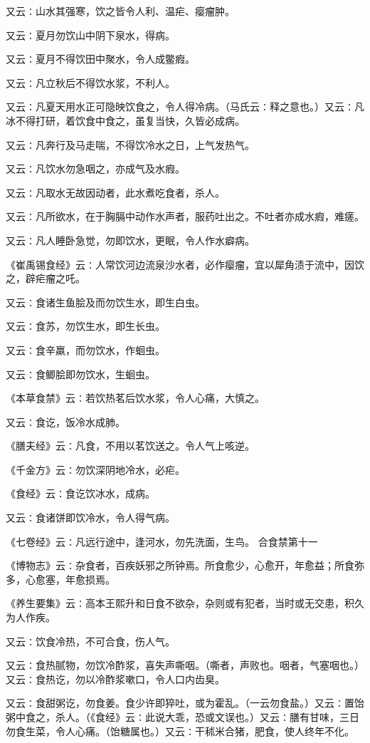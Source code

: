 \documentclass[a4paper,12pt,UTF8,twoside]{ctexbook}
\begin{document}
又云∶山水其强寒，饮之皆令人利、温疟、瘿瘤肿。

又云∶夏月勿饮山中阴下泉水，得病。

又云∶夏月不得饮田中聚水，令人成鳖瘕。

又云∶凡立秋后不得饮水浆，不利人。

又云∶凡夏天用水正可隐映饮食之，令人得冷病。（马氏云∶释之意也。）又云∶凡冰不得打研，着饮食中食之，虽复当快，久皆必成病。

又云∶凡奔行及马走喘，不得饮冷水之日，上气发热气。

又云∶凡饮水勿急咽之，亦成气及水瘕。

又云∶凡取水无故因动者，此水煮吃食者，杀人。

又云∶凡所欲水，在于胸膈中动作水声者，服药吐出之。不吐者亦成水瘕，难瘥。

又云∶凡人睡卧急觉，勿即饮水，更眠，令人作水癖病。

《崔禹锡食经》云∶人常饮河边流泉沙水者，必作瘿瘤，宜以犀角渍于流中，因饮之，辟疟瘤之吒。

又云∶食诸生鱼脍及而勿饮生水，即生白虫。

又云∶食苏，勿饮生水，即生长虫。

又云∶食辛羸，而勿饮水，作蛔虫。

又云∶食鲫脍即勿饮水，生蛔虫。

《本草食禁》云∶若饮热茗后饮水浆，令人心痛，大慎之。

又云∶食讫，饭冷水成肺。

《膳夫经》云∶凡食，不用以茗饮送之。令人气上咳逆。

《千金方》云∶勿饮深阴地冷水，必疟。

《食经》云∶食讫饮冰水，成病。

又云∶食诸饼即饮冷水，令人得气病。

《七卷经》云∶凡远行途中，逢河水，勿先洗面，生鸟。
合食禁第十一

《博物志》云∶杂食者，百疾妖邪之所钟焉。所食愈少，心愈开，年愈益；所食弥多，心愈塞，年愈损焉。

《养生要集》云∶高本王熙升和日食不欲杂，杂则或有犯者，当时或无交患，积久为人作疾。

又云∶饮食冷热，不可合食，伤人气。

又云∶食热腻物，勿饮冷酢浆，喜失声嘶咽。（嘶者，声败也。咽者，气塞咽也。）又云∶食热讫，勿以冷酢浆嗽口，令人口内齿臭。

又云∶食甜粥讫，勿食姜。食少许即猝吐，或为霍乱。（一云勿食盐。）又云∶置饴粥中食之，杀人。（《食经》云∶此说大乖，恐或文误也。）又云∶膳有甘味，三日勿食生菜，令人心痛。（饴糖属也。）又云∶干秫米合猪，肥食，使人终年不化。
\end{document}
